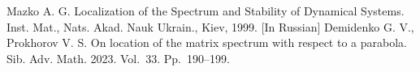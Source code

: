 \documentclass[12pt]{llncs}
\begin{document}

\begin{thebibliography}{9} %
 Mazko A. G. Localization of the Spectrum and Stability of Dynamical Systems. Inst. Mat., Nats. Akad. Nauk Ukrain., Kiev, 1999. [In Russian]
 Demidenko G. V., Prokhorov V. S. On location of the matrix spectrum with respect to a parabola. Sib. Adv. Math. 2023. Vol.~33. Pp.~190–199.
\end{thebibliography}
\end{document}

